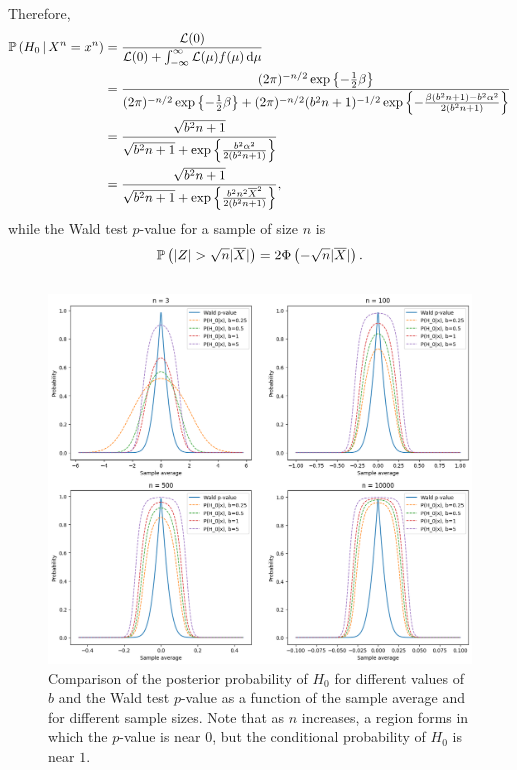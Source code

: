\begin{ex}
  Therefore,
  \begin{align*}
    \mathbb{P}\left(H_0 \,\middle|\, X^n=x^n\right)
     & =\frac{\mathcal{L}(0)}{\mathcal{L}(0)+\int_{-\infty}^\infty \mathcal{L}(\mu)f(\mu)\,\mathrm{d}{\mu}}                        \\
     & =\frac{(2\pi)^{-n/2}\exp\left\{-\frac{1}{2}\beta\right\}}{
      (2\pi)^{-n/2}\exp\left\{-\frac{1}{2}\beta\right\}
      +(2\pi)^{-n/2}(b^2n+1)^{-1/2}\exp\left\{-\frac{\beta (b^2n+1)-b^2\alpha^2}{2(b^2n+1)}\right\}
    }                                                                                           \\
     & =\frac{\sqrt{b^2n+1}}{\sqrt{b^2n+1}+\exp\left\{\frac{b^2\alpha^2}{2(b^2n+1)}\right\}}    \\
     & =\frac{\sqrt{b^2n+1}}{\sqrt{b^2n+1}+\exp\left\{\frac{b^2n^2\overline{X}^2}{2(b^2n+1)}\right\}},
  \end{align*}
  while the Wald test $p$-value for a sample of size $n$ is
  \[
    \P{|Z|>\sqrt{n}|\Xbar|}
    =2\Phi\left(-\sqrt{n}|\Xbar|\right).
  \]

  \inputminted{python}{../code/11-08b.py}
  \begin{figure}[H]
    \centering
    \includegraphics[scale=0.545]{../images/11-08b}
    \caption{Comparison of the posterior probability of $H_0$ for different
      values of $b$ and the Wald test $p$-value as a function of the sample
      average and for different sample sizes. Note that as $n$ increases, a
      region forms in which the $p$-value is near $0$, but the conditional
      probability of $H_0$ is near $1$.}
  \end{figure}

\end{ex}